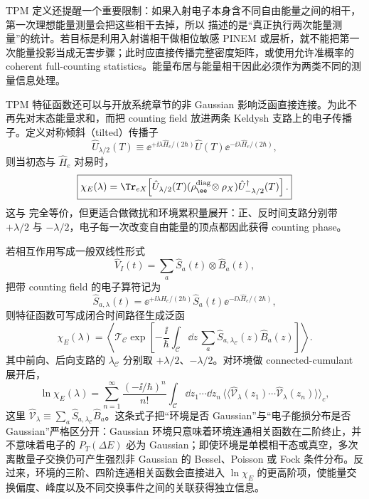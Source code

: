 TPM 定义还提醒一个重要限制：如果入射电子本身含不同自由能量之间的相干，第一次理想能量测量会把这些相干去掉，所以 描述的是“真正执行两次能量测量”的统计。若目标是利用入射谱相干做相位敏感 PINEM 或层析，就不能把第一次能量投影当成无害步骤；此时应直接传播完整密度矩阵，或使用允许准概率的 coherent full-counting statistics。能量布居与能量相干因此必须作为两类不同的测量信息处理。

TPM 特征函数还可以与开放系统章节的非 Gaussian 影响泛函直接连接。为此不再先对末态能量求和，而把 counting field 放进两条 Keldysh 支路上的电子传播子。定义对称倾斜（tilted）传播子
\begin{equation}
\boxed{
\hat U_{\lambda/2}(T)
\equiv
\ee^{+\ii\lambda\hat H_e/(2\hbar)}
\hat U(T)
\ee^{-\ii\lambda\hat H_e/(2\hbar)},}
\label{eq:energy_counting_tilted_propagator}
\end{equation}
则当初态与 $\hat H_e$ 对易时，
\begin{equation}
\boxed{
\chi_E(\lambda)
=
\Tr_{eX}\!\left[
\hat U_{\lambda/2}(T)
(\rho_\ee^{\rm diag}\!\otimes\rho_X)
\hat U_{-\lambda/2}^{\dagger}(T)
\right].}
\label{eq:energy_counting_keldysh_trace}
\end{equation}
这与 完全等价，但更适合做微扰和环境累积量展开：正、反时间支路分别带 $+\lambda/2$ 与 $-\lambda/2$，电子每一次改变自由能量的顶点都因此获得 counting phase。

若相互作用写成一般双线性形式
\[
\hat V_I(t)=\sum_a \hat S_a(t)\otimes\hat B_a(t),
\]
把带 counting field 的电子算符记为
\[
\hat S_{a,\lambda}(t)
=
\ee^{+\ii\lambda\hat H_e/(2\hbar)}
\hat S_a(t)
\ee^{-\ii\lambda\hat H_e/(2\hbar)},
\]
则特征函数可写成闭合时间路径生成泛函
\begin{equation}
\boxed{
\chi_E(\lambda)
=
\left\langle
\mathcal T_{\mathcal C}
\exp\!\left[
-\frac{\ii}{\hbar}
\int_{\mathcal C}\dd z\,
\sum_a
\hat S_{a,\lambda_{\mathcal C}}(z)\hat B_a(z)
\right]
\right\rangle .}
\label{eq:energy_fcs_contour_generating_functional}
\end{equation}
其中前向、后向支路的 $\lambda_{\mathcal C}$ 分别取 $+\lambda/2$、$-\lambda/2$。对环境做 connected-cumulant 展开后，
\begin{equation}
\boxed{
\ln\chi_E(\lambda)
=
\sum_{n=1}^{\infty}
\frac{(-\ii/\hbar)^n}{n!}
\int_{\mathcal C}\dd z_1\cdots\dd z_n\,
\big\langle\!\big\langle
\hat{\mathcal V}_{\lambda}(z_1)\cdots
\hat{\mathcal V}_{\lambda}(z_n)
\big\rangle\!\big\rangle_c,}
\label{eq:energy_fcs_connected_cumulant_expansion}
\end{equation}
这里 $\hat{\mathcal V}_{\lambda}\equiv\sum_a\hat S_{a,\lambda_{\mathcal C}}\hat B_a$。这条式子把“环境是否 Gaussian”与“电子能损分布是否 Gaussian”严格区分开：Gaussian 环境只意味着环境连通相关函数在二阶终止，并不意味着电子的 $P_T(\Delta E)$ 必为 Gaussian；即使环境是单模相干态或真空，多次离散量子交换仍可产生强烈非 Gaussian 的 Bessel、Poisson 或 Fock 条件分布。反过来，环境的三阶、四阶连通相关函数会直接进入 $\ln\chi_E$ 的更高阶项，使能量交换偏度、峰度以及不同交换事件之间的关联获得独立信息。

